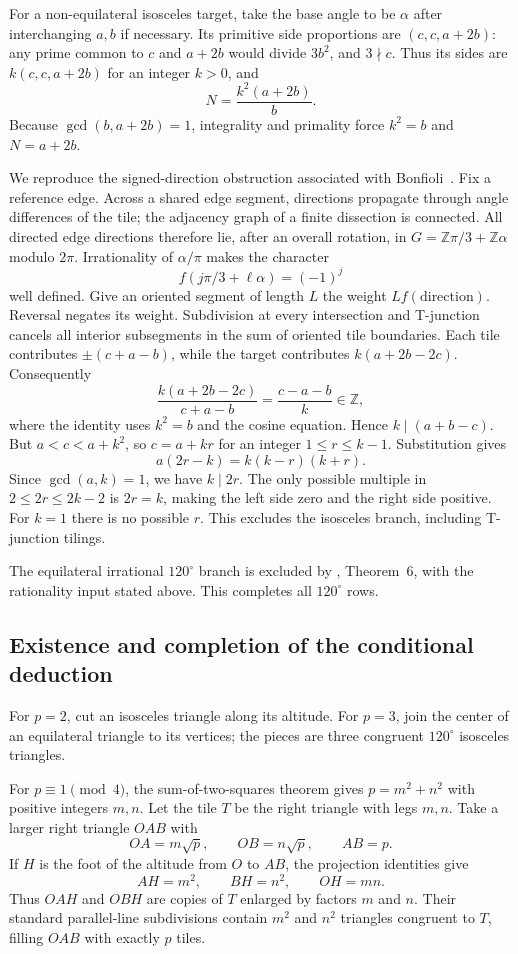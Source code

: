 \documentclass[
  11pt,
  a4paper,
]{article}
\begin{document}
For a non-equilateral isosceles target, take the base angle to be
$\alpha$ after interchanging $a,b$ if necessary. Its primitive side
proportions are $(c,c,a+2b)$: any prime common to $c$ and $a+2b$
would divide $3b^2$, and $3\nmid c$. Thus its sides are
$k(c,c,a+2b)$ for an integer $k>0$, and
\[
N=\frac{k^2(a+2b)}{b}.
\]
Because $\gcd(b,a+2b)=1$, integrality and primality force
$k^2=b$ and $N=a+2b$.

We reproduce the signed-direction obstruction associated with
Bonfioli~\cite{bonfioli}. Fix a reference edge. Across a shared edge
segment, directions propagate through angle differences of the tile;
the adjacency graph of a finite dissection is connected. All directed
edge directions therefore lie, after an overall rotation, in
$G=\mathbb Z\pi/3+\mathbb Z\alpha$ modulo $2\pi$.
Irrationality of $\alpha/\pi$ makes the character
\[
f(j\pi/3+\ell\alpha)=(-1)^j
\]
well defined. Give an oriented segment of length $L$ the weight
$Lf(\text{direction})$. Reversal negates its weight. Subdivision at
every intersection and T-junction cancels all interior subsegments in
the sum of oriented tile boundaries. Each tile contributes
$\pm(c+a-b)$, while the target contributes $k(a+2b-2c)$.
Consequently
\[
\frac{k(a+2b-2c)}{c+a-b}
=\frac{c-a-b}{k}\in\mathbb Z,
\]
where the identity uses $k^2=b$ and the cosine equation. Hence
$k\mid(a+b-c)$. But $a<c<a+k^2$, so $c=a+kr$ for an integer
$1\le r\le k-1$. Substitution gives
\[
a(2r-k)=k(k-r)(k+r).
\]
Since $\gcd(a,k)=1$, we have $k\mid2r$. The only possible
multiple in $2\le2r\le2k-2$ is $2r=k$, making the left side
zero and the right side positive. For $k=1$ there is no possible $r$.
This excludes the isosceles branch, including T-junction tilings.

The equilateral irrational $120^\circ$ branch is excluded by
\cite{equilateral}, Theorem~6, with the rationality input stated
above. This completes all $120^\circ$ rows.

\subsection{Existence and completion of the conditional deduction}

For $p=2$, cut an isosceles triangle along its altitude. For $p=3$,
join the center of an equilateral triangle to its vertices; the pieces
are three congruent $120^\circ$ isosceles triangles.

For $p\equiv1\pmod4$, the sum-of-two-squares theorem gives
$p=m^2+n^2$ with positive integers $m,n$. Let the tile $T$ be the
right triangle with legs $m,n$. Take a larger right triangle $OAB$
with
\[
OA=m\sqrt p,\qquad OB=n\sqrt p,\qquad AB=p.
\]
If $H$ is the foot of the altitude from $O$ to $AB$, the projection
identities give
\[
AH=m^2,\qquad BH=n^2,\qquad OH=mn.
\]
Thus $OAH$ and $OBH$ are copies of $T$ enlarged by factors $m$
and $n$. Their standard parallel-line subdivisions contain $m^2$ and
$n^2$ triangles congruent to $T$, filling $OAB$ with exactly $p$
tiles.
\end{document}
